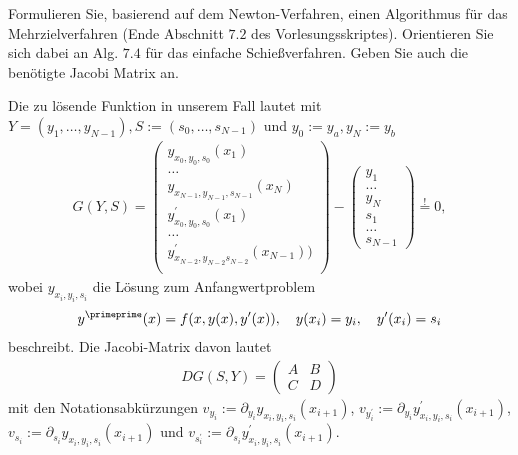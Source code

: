 \begin{exercise}
  Formulieren Sie, basierend auf dem Newton-Verfahren, einen Algorithmus für das
  Mehrzielverfahren (Ende Abschnitt $7.2$ des Vorlesungsskriptes). Orientieren
  Sie sich dabei an Alg. $7.4$ für das einfache Schießverfahren. Geben Sie auch
  die benötigte Jacobi Matrix an.
\end{exercise}

\begin{solution}
  Die zu lösende Funktion in unserem Fall lautet mit $Y = (y_1,\dots,y_{N-1}),
  S := (s_0,\dots,s_{N-1})$ und $y_0 := y_a, y_N := y_b$
  \begin{align*}
    G(Y,S) = \begin{pmatrix}
    y_{x_0,y_0,s_0}(x_1) \\
    \dots \\
    y_{x_{N-1},y_{N-1},s_{N-1}}(x_N) \\
    y^{\prime}_{x_0,y_0,s_0}(x_1) \\
    \dots \\
    y^{\prime}_{x_{N-2},y_{N-2}s_{N-2}}(x_{N-1})) \\
    \end{pmatrix}
    - \begin{pmatrix}
      y_1 \\ \dots \\ y_N \\ s_1 \\ \dots \\ s_{N-1}
  \end{pmatrix}
    \stackrel{!}{=} 0,
  \end{align*}
  wobei $y_{x_i,y_i,s_i}$ die Lösung zum Anfangwertproblem
  \begin{align*}
    y^{\primeprime}(x) = f(x,y(x),y^{\prime}(x)), \quad y(x_i) = y_i, \quad y^{\prime}(x_i) = s_i
  \end{align*}
  beschreibt.
  Die Jacobi-Matrix davon lautet
  \begin{align*}
    DG(S,Y) = \begin{pmatrix}
      A & B \\ C & D
  \end{pmatrix}
  \end{align*}
  mit den Notationsabkürzungen
  $v_{y_i} := \partial_{y_i}y_{x_i,y_i,s_i}(x_{i+1})$,
  $v_{y^{\prime}_i} := \partial_{y_i}y^{\prime}_{x_i,y_i,s_i}(x_{i+1})$,
  $v_{s_i} := \partial_{s_i}y_{x_i,y_i,s_i}(x_{i+1})$ und
  $v_{s^{\prime}_i} := \partial_{s_i}y^{\prime}_{x_i,y_i,s_i}(x_{i+1})$.
  \begin{align*}

\end{align*}
\end{solution}
